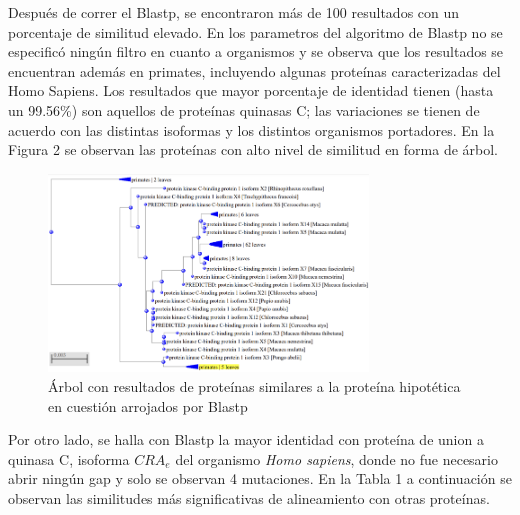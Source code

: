 \documentclass[journal,transmag]{IEEEtran}
\begin{document}
Después de correr el Blastp, se encontraron más de 100 resultados con un porcentaje de similitud elevado. En los parametros del algoritmo de Blastp no se especificó ningún filtro en cuanto a organismos y se observa que los resultados se encuentran además en primates, incluyendo algunas proteínas caracterizadas del Homo Sapiens. Los resultados que mayor porcentaje de identidad tienen (hasta un 99.56\%) son aquellos de proteínas quinasas C; las variaciones se tienen de acuerdo con las distintas isoformas y los distintos organismos portadores. En la Figura 2 se observan las proteínas con alto nivel de similitud en forma de árbol. 
\begin{figure}[!h]
	\center
	\includegraphics[width=8.5cm]{imagenes/similitudes.png}
	\caption{Árbol con resultados de proteínas similares a la proteína hipotética en cuestión arrojados por Blastp}
	\label{2}
\end{figure}

Por otro lado, se halla con Blastp la mayor identidad con proteína de union a quinasa C, isoforma $CRA_e$ del organismo \textit{Homo sapiens}, donde no fue necesario abrir ningún gap y solo se observan 4 mutaciones. En la Tabla 1 a continuación se observan las similitudes más significativas de alineamiento con otras proteínas.  
\end{document}
